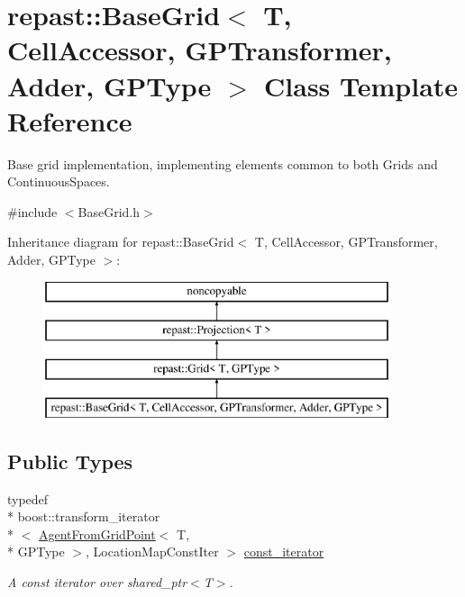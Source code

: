 \hypertarget{classrepast_1_1_base_grid}{\section{repast\-:\-:Base\-Grid$<$ T, Cell\-Accessor, G\-P\-Transformer, Adder, G\-P\-Type $>$ Class Template Reference}
\label{classrepast_1_1_base_grid}
}


Base grid implementation, implementing elements common to both Grids and Continuous\-Spaces.  




{\ttfamily \#include $<$Base\-Grid.\-h$>$}

Inheritance diagram for repast\-:\-:Base\-Grid$<$ T, Cell\-Accessor, G\-P\-Transformer, Adder, G\-P\-Type $>$\-:\begin{figure}[H]
\begin{center}
\leavevmode
\includegraphics[height=4.000000cm]{classrepast_1_1_base_grid}
\end{center}
\end{figure}
\subsection*{Public Types}
\begin{DoxyCompactItemize}
\item 
\hypertarget{classrepast_1_1_base_grid_ae4de9c96ae3ee3d7021a1e5b3c61b9a6}{typedef \\*
boost\-::transform\-\_\-iterator\\*
$<$ \hyperlink{structrepast_1_1_agent_from_grid_point}{Agent\-From\-Grid\-Point}$<$ T, \\*
G\-P\-Type $>$, Location\-Map\-Const\-Iter $>$ \hyperlink{classrepast_1_1_base_grid_ae4de9c96ae3ee3d7021a1e5b3c61b9a6}{const\-\_\-iterator}}\label{classrepast_1_1_base_grid_ae4de9c96ae3ee3d7021a1e5b3c61b9a6}

\begin{DoxyCompactList}\small\item\em A const iterator over shared\-\_\-ptr$<$\-T$>$. \end{DoxyCompactList}\end{DoxyCompactItemize}
